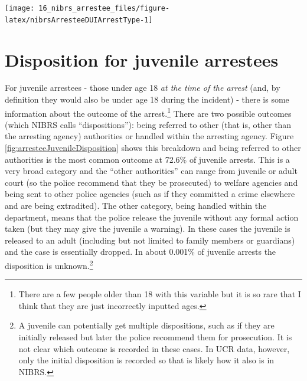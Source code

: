 \documentclass[
]{krantz}
\let\origfigure\figure
\let\endorigfigure\endfigure
\renewenvironment{figure}[1][2] {
    \expandafter\origfigure\expandafter[H]
} {
    \endorigfigure
}
\begin{document}
\begin{figure}

{\centering \texttt{[image: 16\_nibrs\_arrestee\_files/figure-latex/nibrsArresteeDUIArrestType-1]} 

}

\caption{Annual arrest type for DUI arrestees, 1991-2022.}\label{fig:nibrsArresteeDUIArrestType}
\end{figure}

\section{Disposition for juvenile
arrestees}\label{disposition-for-juvenile-arrestees}

For juvenile arrestees - those under age 18 \emph{at the
time of the arrest} (and, by definition they would also be
under age 18 during the incident) - there is some
information about the outcome of the arrest.\footnote{There
  are a few people older than 18 with this variable but it
  is so rare that I think that they are just incorrectly
  inputted ages.} There are two possible outcomes (which
NIBRS calls ``dispositions''): being referred to other (that
is, other than the arresting agency) authorities or handled
within the arresting agency. Figure
\ref{fig:arresteeJuvenileDisposition} shows this breakdown
and being referred to other authorities is the most common
outcome at 72.6\% of juvenile arrests. This is a very broad
category and the ``other authorities'' can range from
juvenile or adult court (so the police recommend that they
be prosecuted) to welfare agencies and being sent to other
police agencies (such as if they committed a crime elsewhere
and are being extradited). The other category, being handled
within the department, means that the police release the
juvenile without any formal action taken (but they may give
the juvenile a warning). In these cases the juvenile is
released to an adult (including but not limited to family
members or guardians) and the case is essentially dropped.
In about 0.001\% of juvenile arrests the disposition is
unknown.\footnote{A juvenile can potentially get multiple
  dispositions, such as if they are initially released but
  later the police recommend them for prosecution. It is not
  clear which outcome is recorded in these cases. In UCR
  data, however, only the initial disposition is recorded so
  that is likely how it also is in NIBRS.}
\end{document}
